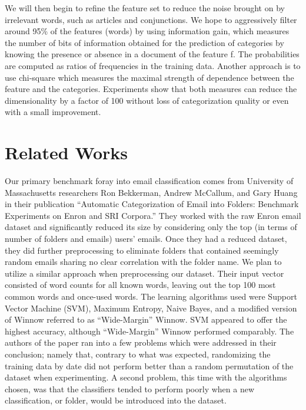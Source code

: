\documentclass[11pt]{article}
\begin{document}
We will then begin to refine the feature set to reduce the noise brought on by irrelevant words, such as articles and conjunctions. We hope to aggressively filter around 95\% of the features (words) by using information gain, which measures the number of bits of information obtained for the prediction of categories by knowing the presence or absence in a document of the feature f. The probabilities are computed as ratios of frequencies in the training data. Another approach is to use chi-square which measures the maximal strength of dependence between the feature and the categories. Experiments show that both measures can reduce the dimensionality by a factor of 100 without loss of categorization quality or even with a small improvement.
\section{Related Works}
\label{sec-2}


Our primary benchmark foray into email classification comes from University of Massachusetts researchers Ron Bekkerman, Andrew McCallum, and Gary Huang in their publication “Automatic Categorization of Email into Folders: Benchmark Experiments on Enron and SRI Corpora.”  They worked with the raw Enron email dataset and significantly reduced its size by considering only the top (in terms of number of folders and emails) users' emails. Once they had a reduced dataset, they did further preprocessing to eliminate folders that contained seemingly random emails sharing no clear correlation with the folder name. We plan to utilize a similar approach when preprocessing our dataset.
Their input vector consisted of word counts for all known words, leaving out the top 100 most common words and once-used words. The learning algorithms used were Support Vector Machine (SVM), Maximum Entropy, Naive Bayes, and a modified version of Winnow referred to as “Wide-Margin” Winnow. SVM appeared to offer the highest accuracy, although “Wide-Margin” Winnow performed comparably.
The authors of the paper ran into a few problems which were addressed in their conclusion; namely that, contrary to what was expected, randomizing the training data by date did not perform better than a random permutation of the dataset when experimenting.  A second problem, this time with the algorithms chosen, was that the classifiers tended to perform poorly when a new classification, or folder, would be introduced into the dataset.
\end{document}
